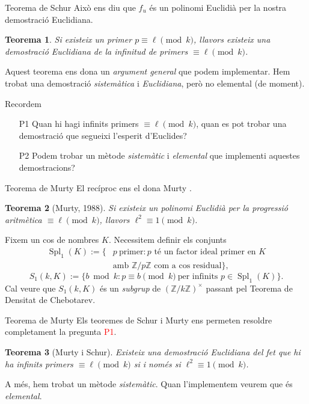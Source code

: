 \documentclass[11pt]{beamer}
\newtheorem{thm}{Teorema}
\newcommand{\Z}{\ensuremath{\mathbb{Z}}}
\DeclareMathOperator{\Spl}{Spl} %
\begin{document}
	\begin{frame}{Teorema de Schur}
		Això ens diu que $f_u$ és un polinomi Euclidià per la nostra demostració Euclidiana.\pause
		\begin{thm}
			Si existeix un primer $p \equiv \ell \pmod{k}$, llavors existeix una demostració Euclidiana de la infinitud de primers $\equiv \ell \pmod{k}$.
		\end{thm}\pause
		Aquest teorema ens dona un \emph{argument general} que podem implementar. \pause Hem trobat una demostració \emph{sistemàtica} i \emph{Euclidiana}, però no elemental (de moment).\pause
	\begin{alertblock}{Recordem}
		\begin{itemize}
			\item[P1] Quan hi hagi infinits primers $\equiv\ell\pmod{k}$, quan es pot trobar una demostració que segueixi l'esperit d'Euclides? \pause
			\item[P2] Podem trobar un mètode \emph{sistemàtic} i \emph{elemental} que implementi aquestes demostracions?
		\end{itemize}
	\end{alertblock}
	\end{frame}
	
	\begin{frame}{Teorema de Murty}
		El recíproc ens el dona Murty \cite{Conrad}.
		\begin{thm}[Murty, 1988]
			Si existeix un polinomi Euclidià per la progressió aritmètica $\equiv \ell\pmod{k}$, llavors $\ell^2\equiv 1\pmod{k}$.
		\end{thm}\pause 	
		Fixem un cos de nombres $K$. Necessitem definir els conjunts
		\begin{align*}
			\Spl_1(K):=\{&p \ \text{primer}: \text{$p$ té un factor ideal primer en $K$} \\
			&\text{amb $\Z/p\Z$ com a cos residual}\},
		\end{align*}\pause
		\begin{equation*}
			S_1(k,K):=\{b \bmod{k}: p\equiv b \pmod{k} \ \text{per infinits $p\in\Spl_1(K)$}\}.
		\end{equation*}\pause
		Cal veure que $S_1(k,K)$ és un \emph{subgrup} de $(\Z/k\Z)^\times$ passant pel Teorema de Densitat de Chebotarev.
	\end{frame}
	
	\begin{frame}{Teorema de Murty}
		Els teoremes de Schur i Murty ens permeten resoldre completament la pregunta \textcolor{red}{P1}.\checkmark \pause
		\vspace{0.25cm}
		\begin{thm}[Murty i Schur]
			Existeix una demostració Euclidiana del fet que hi ha infinits primers $\equiv \ell\pmod{k}$ si i només si $\ell^2\equiv 1\pmod{k}$.
		\end{thm}\pause
		\vspace{0.25cm}
		A més, hem trobat un mètode \emph{sistemàtic}. Quan l'implementem veurem que és \emph{elemental}.
	\end{frame}
	
\end{document}

